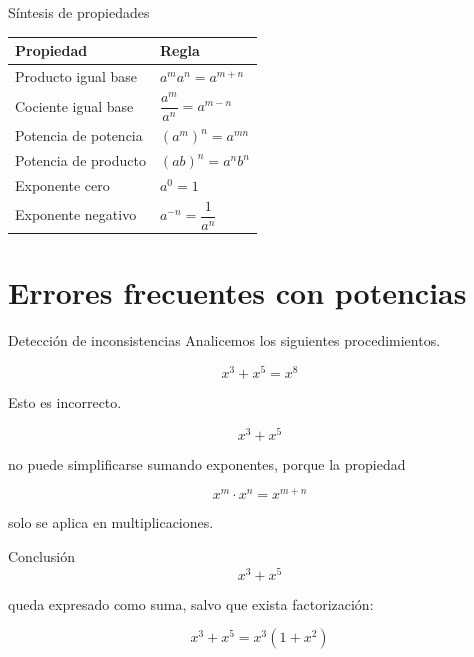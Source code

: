 \documentclass[handout,aspectratio=169]{beamer}
\begin{document}
	\begin{frame}{Síntesis de propiedades}
		\begin{center}
			\renewcommand{\arraystretch}{1.6}
			\begin{tabular}{>{\centering\arraybackslash}m{4cm} >{\centering\arraybackslash}m{5cm}}
				\toprule
				\textbf{Propiedad} & \textbf{Regla} \\
				\midrule
				Producto igual base & \(a^m a^n=a^{m+n}\) \\
				Cociente igual base & \(\dfrac{a^m}{a^n}=a^{m-n}\) \\
				Potencia de potencia & \((a^m)^n=a^{mn}\) \\
				Potencia de producto & \((ab)^n=a^n b^n\) \\
				Exponente cero & \(a^0=1\) \\
				Exponente negativo & \(a^{-n}=\dfrac{1}{a^n}\) \\
				\bottomrule
			\end{tabular}
		\end{center}
	\end{frame}
	
	\section{Errores frecuentes con potencias}
	
	\begin{frame}{Detección de inconsistencias}
		Analicemos los siguientes procedimientos.
		
		\pause
		
		\begin{alerta}
			\[
			x^3+x^5=x^8
			\]
		\end{alerta}
		
		\pause
		
		Esto es incorrecto.
		
		\[
		x^3+x^5
		\]
		
		no puede simplificarse sumando exponentes, porque la propiedad
		
		\[
		x^m\cdot x^n=x^{m+n}
		\]
		
		solo se aplica en multiplicaciones.
		
		\pause
		
		\begin{block}{Conclusión}
			\[
			x^3+x^5
			\]
			
			queda expresado como suma, salvo que exista factorización:
			
			\[
			x^3+x^5=x^3(1+x^2)
			\]
		\end{block}
	\end{frame}
	
\end{document}
